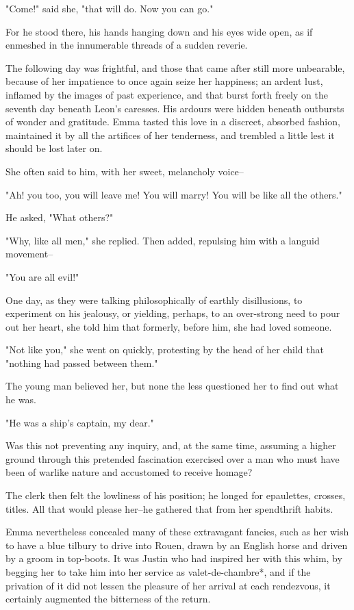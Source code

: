\documentclass[11pt,twocolumn]{ltugboat}
\begin{document}
"Come!" said she, "that will do. Now you can go."

For he stood there, his hands hanging down and his eyes wide open, as if
enmeshed in the innumerable threads of a sudden reverie.

The following day was frightful, and those that came after still more
unbearable, because of her impatience to once again seize her happiness;
an ardent lust, inflamed by the images of past experience, and that
burst forth freely on the seventh day beneath Leon's caresses. His
ardours were hidden beneath outbursts of wonder and gratitude. Emma
tasted this love in a discreet, absorbed fashion, maintained it by all
the artifices of her tenderness, and trembled a little lest it should be
lost later on.

She often said to him, with her sweet, melancholy voice--

"Ah! you too, you will leave me! You will marry! You will be like all
the others."

He asked, "What others?"

"Why, like all men," she replied. Then added, repulsing him with a
languid movement--

"You are all evil!"

One day, as they were talking philosophically of earthly disillusions,
to experiment on his jealousy, or yielding, perhaps, to an over-strong
need to pour out her heart, she told him that formerly, before him, she
had loved someone.

"Not like you," she went on quickly, protesting by the head of her child
that "nothing had passed between them."

The young man believed her, but none the less questioned her to find out
what he was.

"He was a ship's captain, my dear."

Was this not preventing any inquiry, and, at the same time, assuming a
higher ground through this pretended fascination exercised over a man
who must have been of warlike nature and accustomed to receive homage?

The clerk then felt the lowliness of his position; he longed for
epaulettes, crosses, titles. All that would please her--he gathered that
from her spendthrift habits.

Emma nevertheless concealed many of these extravagant fancies, such as
her wish to have a blue tilbury to drive into Rouen, drawn by an English
horse and driven by a groom in top-boots. It was Justin who had inspired
her with this whim, by begging her to take him into her service as
valet-de-chambre*, and if the privation of it did not lessen the
pleasure of her arrival at each rendezvous, it certainly augmented the
bitterness of the return.
\end{document}
